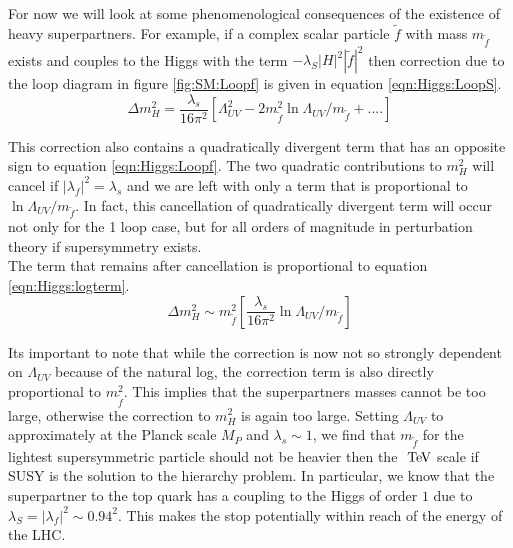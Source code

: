 \indent For now we will look at some phenomenological consequences of the existence of heavy superpartners.  For example, if a complex scalar particle $\tilde{f}$  with mass $m_{\tilde{f}}$ exists and couples to the Higgs with the term $-\lambda_S|H|^2|\tilde{f}|^2$ then correction due to the loop diagram in figure \ref{fig:SM:Loopf} is given in equation \ref{eqn:Higgs:LoopS}. \\

\begin{equation}
\label{eqn:Higgs:LoopS}
\Delta m_H^2 = \frac{\lambda_s}{16\pi^2}[\Lambda^2_{UV} - 2m_{\tilde{f}}^2 \ln{\Lambda_{UV}/m_{\tilde{f}}}+ ....]
\end{equation}

\indent This correction also contains a quadratically divergent term that has an opposite sign to equation \ref{eqn:Higgs:Loopf}.  The two quadratic contributions to $m_H^2$ will cancel if $|\lambda_f|^2 = \lambda_s$ and we are left with only a term that is proportional to $\ln{\Lambda_{UV}/m_{\tilde{f}}}$. In fact, this cancellation of quadratically divergent term will occur not only for the 1 loop case, but for all orders of magnitude in perturbation theory if supersymmetry exists. \\

\indent The term that remains after cancellation is proportional to equation \ref{eqn:Higgs:logterm}. \\

\begin{equation}
\label{eqn:Higgs:LoopS}
\Delta m_H^2 \sim m_{\tilde{f}}^2[\frac{\lambda_s}{16\pi^2}\ln{\Lambda_{UV}/m_{\tilde{f}}}]
\end{equation}

\indent Its important to note that while the correction is now not so strongly dependent on $\Lambda_{UV}$ because of the natural log, the correction term is also directly proportional to $m_{\tilde{f}}^2$.  This implies that the superpartners masses cannot be too large, otherwise the correction to $m_H^2$ is again too large.  Setting $\Lambda_{UV}$ to approximately at the Planck scale $M_P$ and $\lambda_s \sim 1$, we find that $m_{\tilde{f}}$ for the lightest supersymmetric particle should not be heavier then the $\tev$ scale \cite{MartinSUSY} if SUSY is the solution to the hierarchy problem.  In particular, we know that the superpartner to the top quark has a coupling to the Higgs of order $1$ due to $\lambda_S = |\lambda_f|^2 \sim 0.94^2$. This makes the stop potentially within reach of the energy of the LHC. \\


